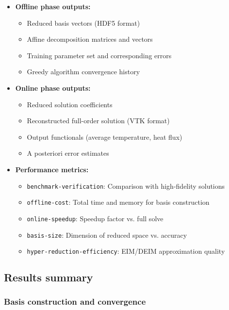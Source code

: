 \begin{itemize}
\item \textbf{Offline phase outputs:}
  \begin{itemize}
  \item Reduced basis vectors (HDF5 format)
  \item Affine decomposition matrices and vectors
  \item Training parameter set and corresponding errors
  \item Greedy algorithm convergence history
  \end{itemize}

\item \textbf{Online phase outputs:}
  \begin{itemize}
  \item Reduced solution coefficients
  \item Reconstructed full-order solution (VTK format)
  \item Output functionals (average temperature, heat flux)
  \item A posteriori error estimates
  \end{itemize}

\item \textbf{Performance metrics:}
  \begin{itemize}
  \item \texttt{benchmark-verification}: Comparison with high-fidelity solutions
  \item \texttt{offline-cost}: Total time and memory for basis construction
  \item \texttt{online-speedup}: Speedup factor vs. full solve
  \item \texttt{basis-size}: Dimension of reduced space vs. accuracy
  \item \texttt{hyper-reduction-efficiency}: EIM/DEIM approximation quality
  \end{itemize}
\end{itemize}



\subsection{Results summary}

\subsubsection{Basis construction and convergence}

